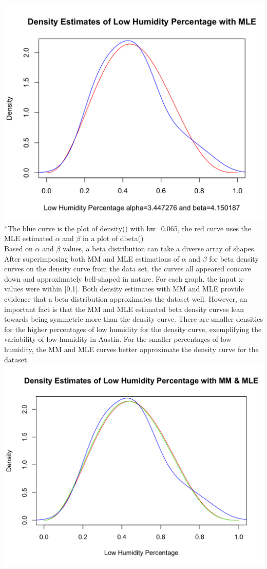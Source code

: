 \documentclass[12pt, letterpaper]{article}
\begin{document}
\includegraphics[scale=0.40]{austinweather_mle.png}
\footnotesize
\\ \**The blue curve is the plot of density() with bw=0.065, the red curve uses the MLE estimated ${\alpha}$ and ${\beta}$ in a plot of dbeta() \\
\normalsize 
Based on ${\alpha}$ and ${\beta}$ values, a beta distribution can take a diverse array of shapes. After superimposing both MM and MLE estimations of ${\alpha}$ and ${\beta}$ for beta density curves on the density curve from the data set, the curves all appeared concave down and approximately bell-shaped in nature. For each graph, the input x-values were within [0,1]. Both density estimates with MM and MLE provide evidence that a beta distribution approximates the dataset well. However, an important fact is that the MM and MLE estimated beta density curves lean towards being symmetric more than the density curve. There are smaller densities for the higher percentages of low humidity for the density curve, exemplifying the variability of low humidity in Austin. For the smaller percentages of low humidity, the MM and MLE curves better approximate the density curve for the dataset. 
\includegraphics[scale=0.40]{austinweather_mmmle.png}
\end{document}
